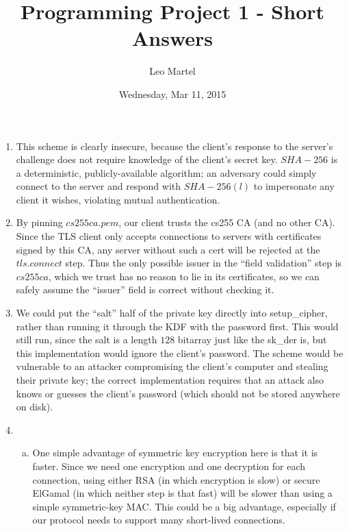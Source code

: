 \documentclass{article}[12pt]
\title{Programming Project 1 - Short Answers}
\author{Leo Martel}
\date{Wednesday, Mar 11, 2015}
\begin{document}
\maketitle

\begin{enumerate}[1.]

\item This scheme is clearly insecure, because the client's response to the server's challenge does not require knowledge of the client's secret key. $SHA-256$ is a deterministic, publicly-available algorithm; an adversary could simply connect to the server and respond with $SHA-256(l)$ to impersonate any client it wishes, violating mutual authentication.

\item By pinning $cs255ca.pem$, our client trusts the cs255 CA (and no other CA). Since the TLS client only accepts connections to servers with certificates signed by this CA, any server without such a cert will be rejected at the $tls.connect$ step. Thus the only possible issuer in the ``field validation'' step is $cs255ca$, which we trust has no reason to lie in its certificates, so we can safely assume the ``issuer'' field is correct without checking it.

\item We could put the ``salt'' half of the private key directly into setup_cipher, rather than running it through the KDF with the password first. This would still run, since the salt is a length $128$ bitarray just like the sk_der is, but this implementation would ignore the client's password. The scheme would be vulnerable to an attacker compromising the client's computer and stealing their private key; the correct implementation requires that an attack also knows or guesses the client's password (which should not be stored anywhere on disk).




\item

\begin{enumerate}[(a)]
\item One simple advantage of symmetric key encryption here is that it is faster. Since we need one encryption and one decryption for each connection, using either RSA (in which encryption is slow) or secure ElGamal (in which neither step is that fast) will be slower than using a simple symmetric-key MAC. This could be a big advantage, especially if our protocol needs to support many short-lived connections.



\end{enumerate}
\end{enumerate}
\end{document}
